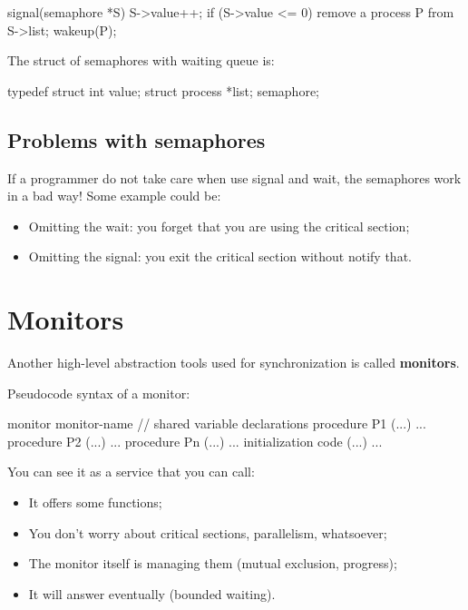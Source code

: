 \begin{codeInC}
signal(semaphore *S) {
    S->value++;
    if (S->value <= 0) {
        remove a process P from S->list;
        wakeup(P);
    }
}    
\end{codeInC}

The struct of semaphores with waiting queue is:

\begin{codeInC}
typedef struct {
    int value;
    struct process *list;
} semaphore; 
\end{codeInC}

\subsection{Problems with semaphores}

If a programmer do not take care when use signal and wait, the semaphores work in a bad way! Some example could be:

\begin{itemize}
    \item[] Omitting the wait: you forget that you are using the critical section;
    \item[] Omitting the signal: you exit the critical section without notify that.
\end{itemize}

\newpage
\section{Monitors}
Another high-level abstraction tools used for synchronization is called \textbf{monitors}. 

Pseudocode syntax of a monitor:

\begin{codeInC}
monitor monitor-name{
    // shared variable declarations
    procedure P1 (...) { ... }
    procedure P2 (...) { ... }
    procedure Pn (...) { ... }
    initialization code (...) { ... }
}
\end{codeInC}

You can see it as a service that you can call:

\begin{itemize}
    \item It offers some functions;
    \item You don’t worry about critical sections, parallelism, whatsoever;
    \item The monitor itself is managing them (mutual exclusion, progress);
    \item It will answer eventually (bounded waiting).
\end{itemize}


